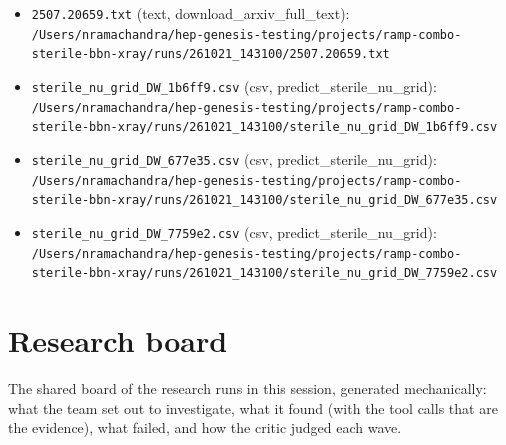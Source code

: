 \documentclass[11pt,a4paper]{article}
\begin{document}
\begin{itemize}
  \item \texttt{2507.20659.txt} (text, download\_arxiv\_full\_text): \texttt{/\allowbreak{}Users/\allowbreak{}nramachandra/\allowbreak{}hep-genesis-testing/\allowbreak{}projects/\allowbreak{}ramp-combo-sterile-bbn-xray/\allowbreak{}runs/\allowbreak{}261021\_\allowbreak{}143100/\allowbreak{}2507.20659.txt}
  \item \texttt{sterile\_\allowbreak{}nu\_\allowbreak{}grid\_\allowbreak{}DW\_\allowbreak{}1b6ff9.csv} (csv, predict\_sterile\_nu\_grid): \texttt{/\allowbreak{}Users/\allowbreak{}nramachandra/\allowbreak{}hep-genesis-testing/\allowbreak{}projects/\allowbreak{}ramp-combo-sterile-bbn-xray/\allowbreak{}runs/\allowbreak{}261021\_\allowbreak{}143100/\allowbreak{}sterile\_\allowbreak{}nu\_\allowbreak{}grid\_\allowbreak{}DW\_\allowbreak{}1b6ff9.csv}
  \item \texttt{sterile\_\allowbreak{}nu\_\allowbreak{}grid\_\allowbreak{}DW\_\allowbreak{}677e35.csv} (csv, predict\_sterile\_nu\_grid): \texttt{/\allowbreak{}Users/\allowbreak{}nramachandra/\allowbreak{}hep-genesis-testing/\allowbreak{}projects/\allowbreak{}ramp-combo-sterile-bbn-xray/\allowbreak{}runs/\allowbreak{}261021\_\allowbreak{}143100/\allowbreak{}sterile\_\allowbreak{}nu\_\allowbreak{}grid\_\allowbreak{}DW\_\allowbreak{}677e35.csv}
  \item \texttt{sterile\_\allowbreak{}nu\_\allowbreak{}grid\_\allowbreak{}DW\_\allowbreak{}7759e2.csv} (csv, predict\_sterile\_nu\_grid): \texttt{/\allowbreak{}Users/\allowbreak{}nramachandra/\allowbreak{}hep-genesis-testing/\allowbreak{}projects/\allowbreak{}ramp-combo-sterile-bbn-xray/\allowbreak{}runs/\allowbreak{}261021\_\allowbreak{}143100/\allowbreak{}sterile\_\allowbreak{}nu\_\allowbreak{}grid\_\allowbreak{}DW\_\allowbreak{}7759e2.csv}
\end{itemize}

\section{Research board}
\label{app:board}
The shared board of the research runs in this session, generated mechanically: what the team set out to investigate, what it found (with the tool calls that are the evidence), what failed, and how the critic judged each wave.
\end{document}
